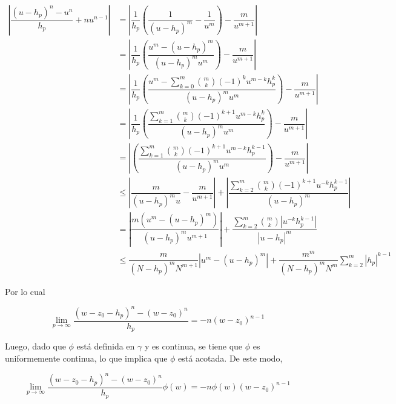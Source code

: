 \documentclass[12pt, fleqn]{article}
\begin{document}
\begin{itemize}
		\begin{align*}
			\left\lvert \dfrac{(u - h_p)^n - u^n}{h_p} + nu^{n-1} \right\rvert &= \left\lvert \dfrac{1}{h_p} \left( \dfrac{1}{(u - h_p)^m} - \dfrac{1}{u^m} \right) - \dfrac{m}{u^{m+1}} \right\rvert \\
			&= \left\lvert \dfrac{1}{h_p} \left( \dfrac{u^m - (u - h_p)^m}{(u - h_p)^m u^m} \right) - \dfrac{m}{u^{m+1}} \right\rvert \\
			&= \left\lvert \dfrac{1}{h_p} \left( \dfrac{u^m - \sum_{k=0}^{m} \binom{m}{k} (-1)^k u^{m-k} h_p^k}{(u - h_p)^m u^m} \right) - \dfrac{m}{u^{m+1}} \right\rvert \\
			&= \left\lvert \dfrac{1}{h_p} \left( \dfrac{\sum_{k=1}^{m} \binom{m}{k} (-1)^{k+1} u^{m-k} h_p^k}{(u - h_p)^m u^m} \right) - \dfrac{m}{u^{m+1}} \right\rvert \\
			&= \left\lvert \left( \dfrac{\sum_{k=1}^{m} \binom{m}{k} (-1)^{k+1} u^{m-k} h_p^{k-1}}{(u - h_p)^m u^m} \right) - \dfrac{m}{u^{m+1}} \right\rvert \\
			&\leq \left\lvert \dfrac{m}{(u - h_p)^m u} - \dfrac{m}{u^{m+1}} \right\rvert + \left\lvert \dfrac{\sum_{k=2}^{m} \binom{m}{k} (-1)^{k+1} u^{-k} h_p^{k-1}}{(u - h_p)^m} \right\rvert \\
			&= \left\lvert \dfrac{m(u^m - (u - h_p)^m)}{(u - h_p)^m u^{m+1}} \right\rvert + \dfrac{\sum_{k=2}^{m} \binom{m}{k} \left\lvert u^{-k} h_p^{k-1} \right\rvert}{\left\lvert u - h_p \right\rvert^m} \\
			&\leq \dfrac{m}{(N - h_p)^m N^{m+1}} \left\lvert u^m - (u - h_p)^m \right\rvert + \dfrac{m^m}{(N - h_p)^m N^m} \sum_{k=2}^{m} \left\lvert h_p \right\rvert^{k-1}
		\end{align*}
		
		Por lo cual

		\begin{equation*}
			\lim_{p \to \infty} \dfrac{(w - z_0 - h_p)^n - (w - z_0)^n}{h_p} = -n(w - z_0)^{n-1}
		\end{equation*}
	\end{itemize}
	
	Luego, dado que $ \phi $ está definida en $ \gamma $ y es continua, se tiene que $ \phi $ es uniformemente continua, lo que implica que $ \phi $ está acotada. De este modo,

	\begin{equation*}
		\lim_{p \to \infty} \dfrac{(w - z_0 - h_p)^n - (w - z_0)^n}{h_p} \phi(w) = -n \phi(w) (w - z_0)^{n-1}
	\end{equation*}
\end{document}
